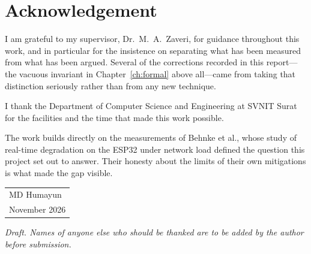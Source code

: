 \chapter*{Acknowledgement}

\noindent I am grateful to my supervisor, Dr.\ M.\ A.\ Zaveri, for guidance throughout this
work, and in particular for the insistence on separating what has been measured from what has
been argued. Several of the corrections recorded in this report---the vacuous invariant in
Chapter~\ref{ch:formal} above all---came from taking that distinction seriously rather than
from any new technique.

\vspace{6pt}
\noindent I thank the Department of Computer Science and Engineering at SVNIT Surat for the
facilities and the time that made this work possible.

\vspace{6pt}
\noindent The work builds directly on the measurements of Behnke et al., whose study of
real-time degradation on the ESP32 under network load defined the question this project set
out to answer. Their honesty about the limits of their own mitigations is what made the gap
visible.

\vspace{18pt}
\noindent\begin{tabular}{@{}l@{}}
MD Humayun \\
November 2026 \\
\end{tabular}

\vspace{20pt}
\noindent\textit{\small Draft. Names of anyone else who should be thanked are to be added by
the author before submission.}
